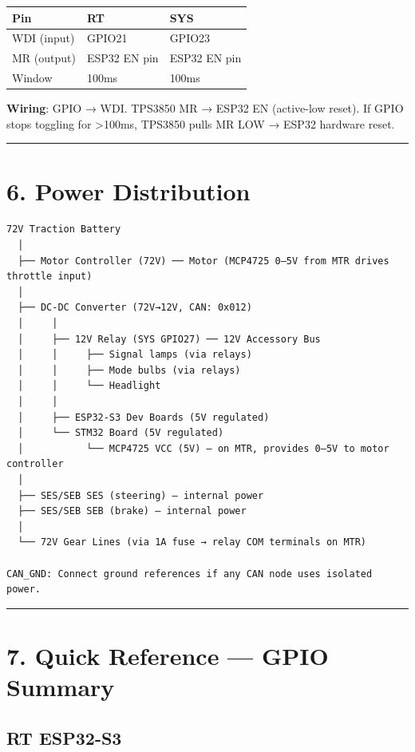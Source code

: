 \documentclass[12pt,a4paper,oneside]{report}
\begin{document}
\begin{longtable}[]{@{}lll@{}}
\toprule\noalign{}
Pin & RT & SYS \\
\midrule\noalign{}
\endhead
\bottomrule\noalign{}
\endlastfoot
WDI (input) & GPIO21 & GPIO23 \\
MR (output) & ESP32 EN pin & ESP32 EN pin \\
Window & 100ms & 100ms \\
\end{longtable}

\textbf{Wiring}: GPIO → WDI. TPS3850 MR → ESP32 EN (active-low reset). If GPIO
stops toggling for \textgreater100ms, TPS3850 pulls MR LOW → ESP32 hardware
reset.

\begin{center}\rule{0.5\linewidth}{0.5pt}\end{center}

\section{6. Power Distribution}\label{power-distribution}

\begin{verbatim}
72V Traction Battery
  │
  ├── Motor Controller (72V) ── Motor (MCP4725 0–5V from MTR drives throttle input)
  │
  ├── DC-DC Converter (72V→12V, CAN: 0x012)
  │     │
  │     ├── 12V Relay (SYS GPIO27) ── 12V Accessory Bus
  │     │     ├── Signal lamps (via relays)
  │     │     ├── Mode bulbs (via relays)
  │     │     └── Headlight
  │     │
  │     ├── ESP32-S3 Dev Boards (5V regulated)
  │     └── STM32 Board (5V regulated)
  │           └── MCP4725 VCC (5V) — on MTR, provides 0–5V to motor controller
  │
  ├── SES/SEB SES (steering) — internal power
  ├── SES/SEB SEB (brake) — internal power
  │
  └── 72V Gear Lines (via 1A fuse → relay COM terminals on MTR)

CAN_GND: Connect ground references if any CAN node uses isolated power.
\end{verbatim}

\begin{center}\rule{0.5\linewidth}{0.5pt}\end{center}

\section{7. Quick Reference --- GPIO
Summary}\label{quick-reference-gpio-summary}

\subsection{RT ESP32-S3}\label{rt-esp32-s3}
\end{document}
